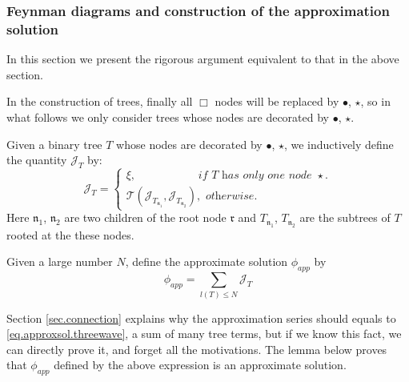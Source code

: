 \subsubsection{Feynman diagrams and construction of the approximation solution} In this section we present the rigorous argument equivalent to that in the above section. 

In the construction of trees, finally all $\Box$ nodes will be replaced by $\bullet$, $\star$, so in what follows we only consider trees whose nodes are decorated by $\bullet$, $\star$.

\begin{defn}\label{def.treeterms} Given a binary tree $T$ whose nodes are decorated by $\bullet$, $\star$,
we inductively define the quantity $\mathcal{J}_T$ by:
\begin{equation}\label{eq.treeterm.threewave}
    \mathcal{J}_T=
    \begin{cases}
    \xi, \qquad\qquad\quad\  \textit{ if $T$ has only one node $\star$.}
    \\
    \mathcal{T}(\mathcal{J}_{T_{\mathfrak{n}_1}}, \mathcal{J}_{T_{\mathfrak{n}_2}}), \textit{ otherwise.}
    \end{cases}
\end{equation}
Here $\mathfrak{n}_1$, $\mathfrak{n}_2$ are two children of the root node $\mathfrak{r}$ and $T_{\mathfrak{n}_1}$, $T_{\mathfrak{n}_2}$ are the subtrees of $T$ rooted at the these nodes.
\end{defn}

\begin{defn}
Given a large number $N$, define the approximate solution $\phi_{app}$ by
\begin{equation}\label{eq.approxsol.threewave}
    \phi_{app}=\sum_{l(T)\le N} \mathcal{J}_T
\end{equation}
\end{defn}

Section \ref{sec.connection} explains why the approximation series should equals to \eqref{eq.approxsol.threewave}, a sum of many tree terms, but if we know this fact, we can directly prove it, and forget all the motivations. The lemma below proves that $\phi_{app}$ defined by the above expression is an approximate solution.  

